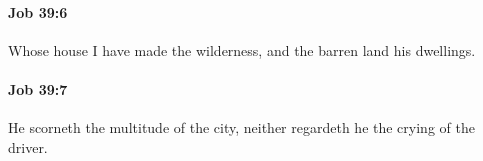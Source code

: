 		\paragraph{Job 39:6} %
			\label{JOB-39-6}

			Whose house I have made the wilderness, and the barren land his dwellings.


		\paragraph{Job 39:7} %
			\label{JOB-39-7}

			He scorneth the multitude of the city, neither regardeth he the crying of the driver.


